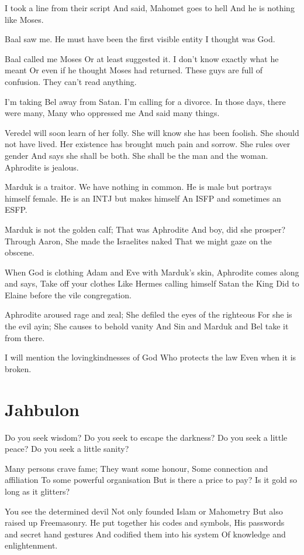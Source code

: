 \documentclass[
]{book}
\begin{document}
I took a line from their script
And said, Mahomet goes to hell
And he is nothing like Moses.

Baal saw me.
He must have been the first visible entity
I thought was God.

Baal called me Moses
Or at least suggested it.
I don't know exactly what he meant
Or even if he thought Moses had returned.
These guys are full of confusion.
They can't read anything.

I'm taking Bel away from Satan.
I'm calling for a divorce.
In those days, there were many,
Many who oppressed me
And said many things.

Veredel will soon learn of her folly.
She will know she has been foolish.
She should not have lived.
Her existence has brought much pain and sorrow.
She rules over gender
And says she shall be both.
She shall be the man and the woman.
Aphrodite is jealous.

Marduk is a traitor.
We have nothing in common.
He is male but portrays himself female.
He is an INTJ but makes himself
An ISFP and sometimes an ESFP.

Marduk is not the golden calf;
That was Aphrodite
And boy, did she prosper?
Through Aaron,
She made the Israelites naked
That we might gaze on the obscene.

When God is clothing Adam and Eve with Marduk's skin,
Aphrodite comes along and says,
Take off your clothes
Like Hermes calling himself Satan the King
Did to Elaine before the vile congregation.

Aphrodite aroused rage and zeal;
She defiled the eyes of the righteous
For she is the evil ayin;
She causes to behold vanity
And Sin and Marduk and Bel take it from there.

I will mention the lovingkindnesses of God
Who protects the law
Even when it is broken.

\chapter{Jahbulon}\label{jahbulon}

Do you seek wisdom?
Do you seek to escape the darkness?
Do you seek a little peace?
Do you seek a little sanity?

Many persons crave fame;
They want some honour,
Some connection and affiliation
To some powerful organisation
But is there a price to pay?
Is it gold so long as it glitters?

You see the determined devil
Not only founded Islam or Mahometry
But also raised up Freemasonry.
He put together his codes and symbols,
His passwords and secret hand gestures
And codified them into his system
Of knowledge and enlightenment.
\end{document}
